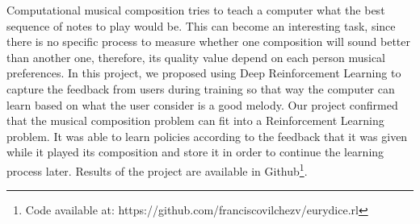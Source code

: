 Computational musical composition tries to teach a computer what the best sequence of notes to play would be. This can become an interesting task, since there is no specific process to measure whether one composition will sound better than another one, therefore, its quality value depend on each person musical preferences. In this project, we proposed using Deep Reinforcement Learning to capture the feedback from users during training so that way the computer can learn based on what the user consider is a good melody. Our project confirmed that the musical composition problem can fit into a Reinforcement Learning problem. It was able to learn policies according to the feedback that it was given while it played its composition and store it in order to continue the learning process later. Results of the project are available in Github\footnote{Code available at: https://github.com/franciscovilchezv/eurydice.rl}.